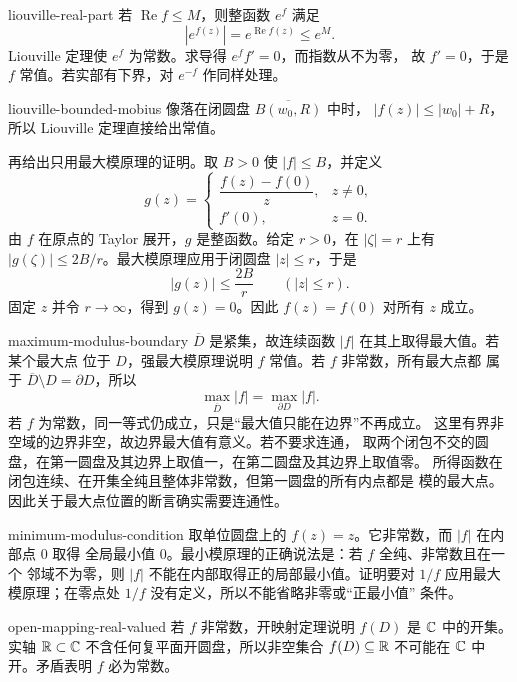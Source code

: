 \begin{solution}{liouville-real-part}
若 \(\operatorname{Re}f\le M\)，则整函数 \(e^f\) 满足
\[
 |e^{f(z)}|=e^{\operatorname{Re}f(z)}\le e^M.
\]
Liouville 定理使 \(e^f\) 为常数。求导得 \(e^ff'=0\)，而指数从不为零，
故 \(f'=0\)，于是 \(f\) 常值。若实部有下界，对 \(e^{-f}\) 作同样处理。
\end{solution}

\begin{solution}{liouville-bounded-mobius}
像落在闭圆盘 \(\overline{B(w_0,R)}\) 中时，
\(|f(z)|\le |w_0|+R\)，所以 Liouville 定理直接给出常值。

再给出只用最大模原理的证明。取 \(B>0\) 使 \(|f|\le B\)，并定义
\[
 g(z)=
 \begin{cases}
  \dfrac{f(z)-f(0)}z,&z\ne0,\\[4pt]
  f'(0),&z=0.
 \end{cases}
\]
由 \(f\) 在原点的 Taylor 展开，\(g\) 是整函数。给定 \(r>0\)，在
\(|\zeta|=r\) 上有 \(|g(\zeta)|\le 2B/r\)。最大模原理应用于闭圆盘
\(|z|\le r\)，于是
\[
 |g(z)|\le\frac{2B}{r}\qquad(|z|\le r).
\]
固定 \(z\) 并令 \(r\to\infty\)，得到 \(g(z)=0\)。因此
\(f(z)=f(0)\) 对所有 \(z\) 成立。
\end{solution}

\begin{solution}{maximum-modulus-boundary}
\(\overline D\) 是紧集，故连续函数 \(|f|\) 在其上取得最大值。若某个最大点
位于 \(D\)，强最大模原理说明 \(f\) 常值。若 \(f\) 非常数，所有最大点都
属于 \(\overline D\setminus D=\partial D\)，所以
\[
 \max_{\overline D}|f|=\max_{\partial D}|f|.
\]
若 \(f\) 为常数，同一等式仍成立，只是“最大值只能在边界”不再成立。
这里有界非空域的边界非空，故边界最大值有意义。若不要求连通，
取两个闭包不交的圆盘，在第一圆盘及其边界上取值一，在第二圆盘及其边界上取值零。
所得函数在闭包连续、在开集全纯且整体非常数，但第一圆盘的所有内点都是
模的最大点。因此关于最大点位置的断言确实需要连通性。
\end{solution}

\begin{solution}{minimum-modulus-condition}
取单位圆盘上的 \(f(z)=z\)。它非常数，而 \(|f|\) 在内部点 \(0\) 取得
全局最小值 \(0\)。最小模原理的正确说法是：若 \(f\) 全纯、非常数且在一个
邻域不为零，则 \(|f|\) 不能在内部取得正的局部最小值。证明要对 \(1/f\)
应用最大模原理；在零点处 \(1/f\) 没有定义，所以不能省略非零或“正最小值”
条件。
\end{solution}

\begin{solution}{open-mapping-real-valued}
若 \(f\) 非常数，开映射定理说明 \(f(D)\) 是 \(\mathbb{C}\) 中的开集。实轴
\(\mathbb{R}\subset\mathbb{C}\) 不含任何复平面开圆盘，所以非空集合
\(f(D)\subseteq\mathbb{R}\) 不可能在 \(\mathbb{C}\) 中开。矛盾表明 \(f\) 必为常数。
\end{solution}

